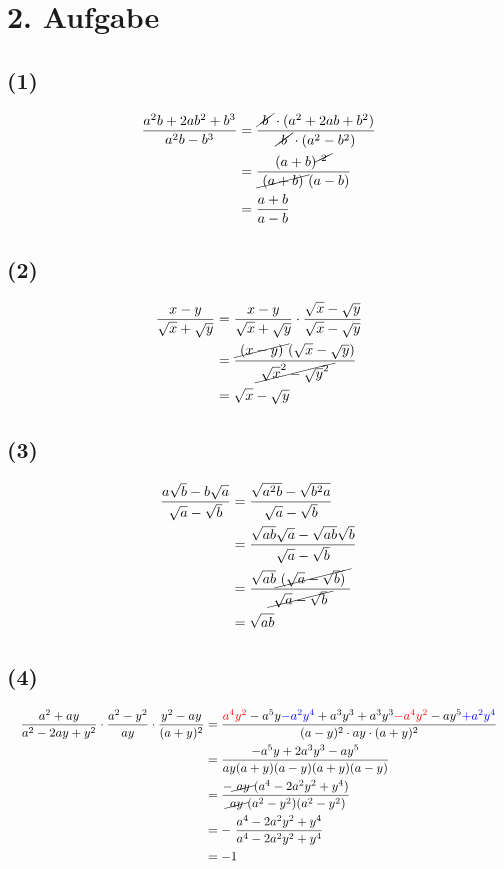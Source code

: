 \documentclass[]{article}
\newcommand{\del}[1]{\cancel{~#1~}}
\begin{document}
\section*{2. Aufgabe}
	\subsection*{(1)}
		\begin{align*}
			&&  \frac{a^2b+2ab^2+b^3}{a^2b-b^3} &= \frac{\del{b}\cdot(a^2+2ab+b^2)}{\del{b}\cdot(a^2-b^2)} &&\\
			&& &= \frac{(a+b)^{\del{2}}}{\del{(a+b)}(a-b)} &&\\
			&& &= \frac{a+b}{a-b} &&\\
		\end{align*}
	\subsection*{(2)}
		\begin{align*}
			&& \frac{x-y}{\sqrt{x}+\sqrt{y}} &=
				\frac{x-y}{\sqrt{x}+\sqrt{y}} \cdot \frac{\sqrt{x}-\sqrt{y}}{\sqrt{x}-\sqrt{y}} &&\\
			&& &= \frac{\del{(x-y)}(\sqrt{x}-\sqrt{y})}{\del{\sqrt{x}^2-\sqrt{y}^2}} &&\\
			&& &= \sqrt{x}-\sqrt{y}&&\\
		\end{align*}
	\subsection*{(3)}
		\begin{align*}
			&& \frac{a\sqrt{b}-b\sqrt{a}}{\sqrt{a}-\sqrt{b}} &= \frac{\sqrt{a^2b}-\sqrt{b^2a}}{\sqrt{a}-\sqrt{b}}&&\\
			&& &= \frac{\sqrt{ab}\sqrt{a}-\sqrt{ab}\sqrt{b}}{\sqrt{a}-\sqrt{b}}&&\\
			&& &= \frac{\sqrt{ab}\del{(\sqrt{a}-\sqrt{b})}}{\del{\sqrt{a}-\sqrt{b}}}&&\\
			&& &= \sqrt{ab}&&\\
		\end{align*}
	\subsection*{(4)}
		\begin{align*}
			&& \frac{a^2+ay}{a^2-2ay+y^2} \cdot \frac{a^2-y^2}{ay} \cdot \frac{y^2-ay}{(a+y)^2} &=
			\frac{\textcolor{red}{a^4y^2}-a^5y \textcolor{blue}{-a^2y^4}+a^3y^3+a^3y^3\textcolor{red}{-a^4y^2}-ay^5\textcolor{blue}{+a^2y^4}}
			{(a-y)^2 \cdot ay \cdot (a+y)^2} &&\\
			&& &= \frac{-a^5y+2a^3y^3-ay^5}{ay(a+y)(a-y)(a+y)(a-y)}&&\\
			&& &= \frac{-\del{ay}(a^4-2a^2y^2+y^4)}{\del{ay}(a^2-y^2)(a^2-y^2)}&&\\
			&& &= -~\frac{a^4-2a^2y^2+y^4}{a^4-2a^2y^2+y^4}&&\\
			&& &= -1&&\\
		\end{align*}
\end{document}
